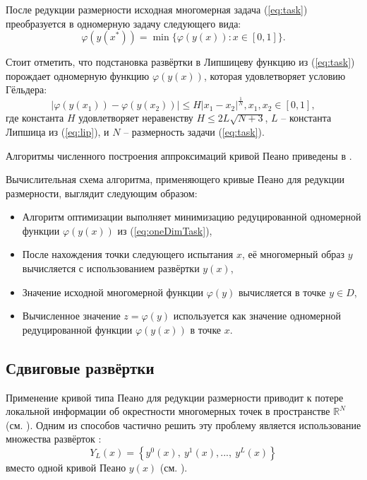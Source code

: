 \par
После редукции размерности исходная многомерная задача (\ref{eq:task}) преобразуется в одномерную задачу
следующего вида:
\begin{equation}
\label{eq:oneDimTask}
\varphi(y(x^*))=\min\{\varphi(y(x)):x\in [0,1]\}.
\end{equation}
\par
Стоит отметить, что подстановка развёртки в Липшицеву функцию  %
из (\ref{eq:task}) порождает одномерную функцию \(\varphi(y(x))\), которая удовлетворяет условию Гёльдера:
\begin{equation}
\label{eq:holder}
|\varphi(y(x_1))-\varphi(y(x_2))|\leq H{|x_1-x_2|}^{\frac{1}{N}}, x_1,x_2\in[0,1],
\end{equation}
где константа $H$ удовлетворяет неравенству \(H\leqslant2L\sqrt{N+3}\), \(L\) -- константа Липшица из (\ref{eq:lip}),
и \(N\) -- размерность задачи (\ref{eq:task}).
\par
Алгоритмы численного построения аппроксимаций кривой Пеано приведены в \cite{strSergGO}.

\par
Вычислительная схема алгоритма, применяющего кривые Пеано для редукции размерности, выглядит следующим образом:
\begin{itemize}
  \item Алгоритм оптимизации выполняет минимизацию редуцированной одномерной функции
  \(\varphi(y(x))\) из (\ref{eq:oneDimTask}),
  \item После нахождения точки следующего испытания \(x\), её многомерный образ \(y\)
  вычисляется с использованием развёртки \(y(x)\),
  \item Значение исходной многомерной функции \(\varphi(y)\) вычисляется в точке \(y\in D\),
  \item Вычисленное значение \(z=\varphi(y)\) используется как значение одномерной редуцированной функции \(\varphi(y(x))\) в точке \(x\).
\end{itemize}

\subsection{Сдвиговые развёртки}
\label{sec:shifted}

Применение кривой типа Пеано для редукции размерности приводит к потере локальной информации об окрестности многомерных точек
в пространстве $\mathbb{R}^N$ (см. \cite{Strongin1992}).
Одним из способов частично решить эту проблему является использование множества развёрток \cite{Strongin1992}:
\begin{equation}%
Y_L(x)=\left\{y^0(x),\ y^1(x),...,\ y^L(x)\right\}
\end{equation}
вместо одной кривой Пеано $y(x)$ (см. \cite{Strongin1992,Strongin2000, Strongin1991}).

